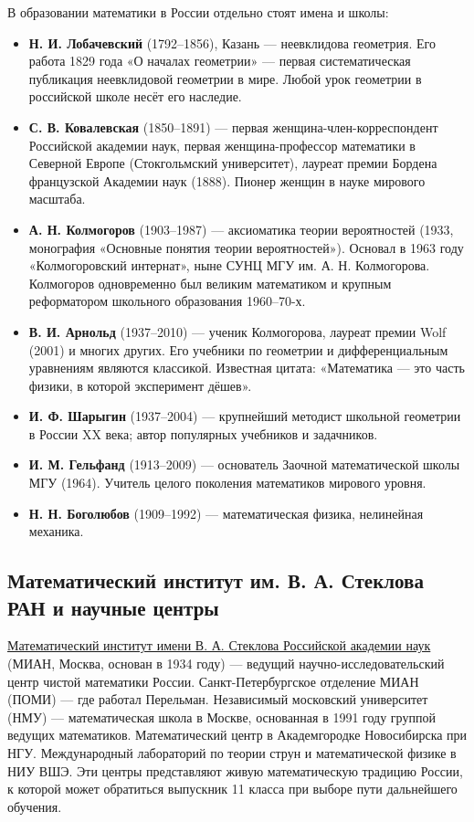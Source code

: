 \documentclass[12pt,a4paper]{scrartcl}
\newcommand{\acc}[1]{\textcolor{accent}{\textbf{#1}}}
\begin{document}
В образовании математики в России отдельно стоят имена и школы:

\begin{itemize}[leftmargin=1.3em,itemsep=0.15em,topsep=0.3em]
  \item \acc{Н. И. Лобачевский} (1792--1856), Казань --- неевклидова геометрия. Его работа 1829 года «О началах геометрии» --- первая систематическая публикация неевклидовой геометрии в мире. Любой урок геометрии в российской школе несёт его наследие.
  \item \acc{С. В. Ковалевская} (1850--1891) --- первая женщина-член-корреспондент Российской академии наук, первая женщина-профессор математики в Северной Европе (Стокгольмский университет), лауреат премии Бордена французской Академии наук (1888). Пионер женщин в науке мирового масштаба.
  \item \acc{А. Н. Колмогоров} (1903--1987) --- аксиоматика теории вероятностей (1933, монография «Основные понятия теории вероятностей»). Основал в 1963 году «Колмогоровский интернат», ныне СУНЦ МГУ им. А. Н. Колмогорова. Колмогоров одновременно был великим математиком и крупным реформатором школьного образования 1960--70-х.
  \item \acc{В. И. Арнольд} (1937--2010) --- ученик Колмогорова, лауреат премии Wolf (2001) и многих других. Его учебники по геометрии и дифференциальным уравнениям являются классикой. Известная цитата: «Математика --- это часть физики, в которой эксперимент дёшев».
  \item \acc{И. Ф. Шарыгин} (1937--2004) --- крупнейший методист школьной геометрии в России XX века; автор популярных учебников и задачников.
  \item \acc{И. М. Гельфанд} (1913--2009) --- основатель Заочной математической школы МГУ (1964). Учитель целого поколения математиков мирового уровня.
  \item \acc{Н. Н. Боголюбов} (1909--1992) --- математическая физика, нелинейная механика.
\end{itemize}

\subsection{Математический институт им. В. А. Стеклова РАН и научные центры}

\href{https://www.mathnet.ru/}{Математический институт имени В. А. Стеклова Российской академии наук} (МИАН, Москва, основан в 1934 году) --- ведущий научно-исследовательский центр чистой математики России. Санкт-Петербургское отделение МИАН (ПОМИ) --- где работал Перельман. Независимый московский университет (НМУ) --- математическая школа в Москве, основанная в 1991 году группой ведущих математиков. Математический центр в Академгородке Новосибирска при НГУ. Международный лабораторий по теории струн и математической физике в НИУ ВШЭ. Эти центры представляют живую математическую традицию России, к которой может обратиться выпускник 11 класса при выборе пути дальнейшего обучения.
\end{document}

